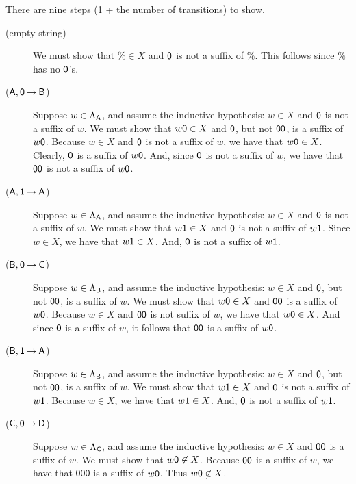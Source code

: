 There are nine steps (1 + the number of transitions) to show.
\begin{description}
\item[\quad(empty string)] We must show that  $\%\in X$ and
  $\mathsf{0}$ is not a suffix of $\%$.  This follows since $\%$ has
  no $\mathsf{0}$'s.

\item[\quad($\mathsf{A}, \mathsf{0}\mathbin{\to}\mathsf{B}$)] Suppose $w\in\Lambda_{\mathsf{A}}$, and
  assume the inductive hypothesis: $w\in X$ and $\mathsf{0}$ is not a
  suffix of $w$.  We must show that $w\mathsf{0}\in X$ and
  $\mathsf{0}$, but not $\mathsf{0}\mathsf{0}$, is a suffix of
  $w\mathsf{0}$. Because $w\in X$ and $\mathsf{0}$ is not a suffix of $w$,
  we have that $w\mathsf{0}\in X$.  Clearly, $\mathsf{0}$ is a suffix of
  $w\mathsf{0}$.  And, since $\mathsf{0}$ is not a suffix of $w$, we have
  that $\mathsf{0}\mathsf{0}$ is not a suffix of $w\mathsf{0}$.

\item[\quad($\mathsf{A}, \mathsf{1}\mathbin{\to}\mathsf{A}$)] Suppose $w\in\Lambda_{\mathsf{A}}$, and
  assume the inductive hypothesis: $w\in X$ and $\mathsf{0}$ is not a
  suffix of $w$.  We must show that $w\mathsf{1}\in X$ and $\mathsf{0}$ is
  not a suffix of $w\mathsf{1}$.  Since $w\in X$, we have that $w\mathsf{1}\in
  X$.  And, $\mathsf{0}$ is not a suffix of $w\mathsf{1}$.

\item[\quad($\mathsf{B}, \mathsf{0}\mathbin{\to}\mathsf{C}$)] Suppose $w\in\Lambda_{\mathsf{B}}$, and
  assume the inductive hypothesis: $w\in X$ and $\mathsf{0}$, but not
  $\mathsf{0}\mathsf{0}$, is a suffix of $w$.  We must show that
  $w\mathsf{0}\in X$ and $\mathsf{0}\mathsf{0}$ is a suffix of $w\mathsf{0}$.
  Because $w\in X$ and $\mathsf{0}\mathsf{0}$ is not suffix of $w$, we have
  that $w\mathsf{0}\in X$.  And since $\mathsf{0}$ is a suffix of $w$, it
  follows that $\mathsf{0}\mathsf{0}$ is a suffix of $w\mathsf{0}$.

\item[\quad($\mathsf{B}, \mathsf{1}\mathbin{\to}\mathsf{A}$)] Suppose $w\in\Lambda_{\mathsf{B}}$, and
  assume the inductive hypothesis: $w\in X$ and $\mathsf{0}$, but not
  $\mathsf{0}\mathsf{0}$, is a suffix of $w$.  We must show that $w\mathsf{1}\in
  X$ and $\mathsf{0}$ is not a suffix of $w\mathsf{1}$.  Because $w\in X$, we
  have that $w\mathsf{1}\in X$.  And, $\mathsf{0}$ is not a suffix of
  $w\mathsf{1}$.

\item[\quad($\mathsf{C}, \mathsf{0}\mathbin{\to}\mathsf{D}$)] Suppose $w\in\Lambda_{\mathsf{C}}$, and
  assume the inductive hypothesis: $w\in X$ and $\mathsf{0}\mathsf{0}$ is a
  suffix of $w$.  We must show that $w\mathsf{0}\not\in X$.  Because
  $\mathsf{0}\mathsf{0}$ is a suffix of $w$, we have that $\mathsf{000}$ is
  a suffix of $w\mathsf{0}$.  Thus $w\mathsf{0}\not\in X$.


\end{description}
